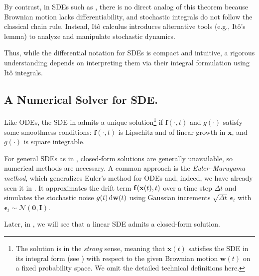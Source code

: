 By contrast, in SDEs such as , there is no direct analog of this theorem because Brownian motion lacks differentiability, and stochastic integrals do not follow the classical chain rule. Instead, Itô calculus introduces alternative tools (e.g., Itô's lemma) to analyze and manipulate stochastic dynamics.

Thus, while the differential notation for SDEs is compact and intuitive, a rigorous understanding depends on interpreting them via their integral formulation using Itô integrals.



\subsection{A Numerical Solver for SDE.} Like ODEs, the SDE in  admits a unique solution\footnote{The solution is in the \emph{strong} sense, meaning that $\mathbf{x}(t)$ satisfies the SDE in its integral form (see ) with respect to the given Brownian motion $\mathbf{w}(t)$ on a fixed probability space. We omit the detailed technical definitions here.} if $\mathbf{f}(\cdot, t)$ and $g(\cdot)$ satisfy some smoothness conditions: $\mathbf{f}(\cdot, t)$ is Lipschitz and of linear growth in $\mathbf{x}$, and $g(\cdot)$ is square integrable.


For general SDEs as in , closed-form solutions are generally unavailable, so numerical methods are necessary. A common approach is the \emph{Euler–Maruyama method}, which generalizes Euler’s method for ODEs and, indeed, we have already seen it in . It approximates the drift term ${\mathbf{f}}({\mathbf{x}}(t), t)$ over a time step $\Delta t$ and simulates the stochastic noise $g(t) \mathop{}\!\mathrm{d} {\mathbf{w}}(t)$ using Gaussian increments $\sqrt{\Delta t} \, \boldsymbol{\epsilon}_t$ with $\boldsymbol{\epsilon}_t \sim \mathcal{N}(\mathbf{0}, \mathbf{I})$. 

Later, in , we will see that a linear SDE admits a closed-form solution.


